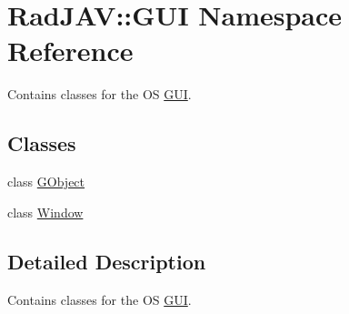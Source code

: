 \hypertarget{namespace_rad_j_a_v_1_1_g_u_i}{}\section{Rad\+J\+AV\+:\+:G\+UI Namespace Reference}
\label{namespace_rad_j_a_v_1_1_g_u_i}


Contains classes for the OS \hyperlink{namespace_rad_j_a_v_1_1_g_u_i}{G\+UI}.  


\subsection*{Classes}
\begin{DoxyCompactItemize}
\item 
class \hyperlink{class_rad_j_a_v_1_1_g_u_i_1_1_g_object}{G\+Object}
\item 
class \hyperlink{class_rad_j_a_v_1_1_g_u_i_1_1_window}{Window}
\end{DoxyCompactItemize}


\subsection{Detailed Description}
Contains classes for the OS \hyperlink{namespace_rad_j_a_v_1_1_g_u_i}{G\+UI}. 